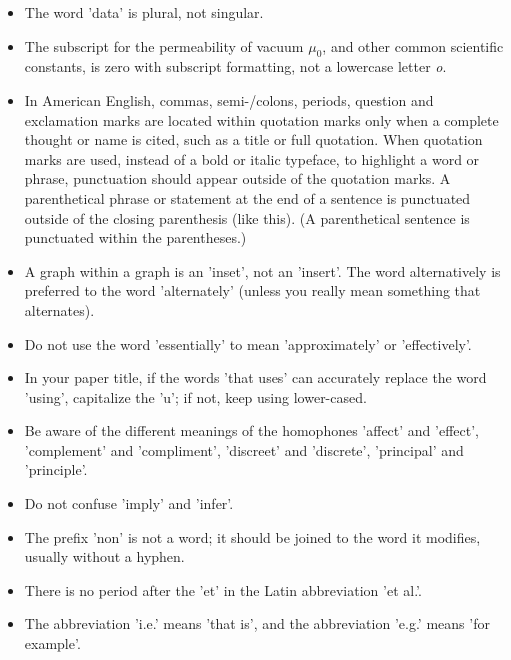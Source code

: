 \documentclass{IEEEtran4PSCC}
\begin{document}
\begin{itemize}
\setlength\itemsep{1em}

\item
The word 'data' is plural, not singular.

\item
The subscript for the permeability of vacuum $\mu_0$, and other common scientific constants, is zero with subscript formatting, not a lowercase letter \emph{o}.

\item
In American English, commas, semi-/colons, periods, question and exclamation marks are located within quotation marks only when a complete thought or name is cited, such as a title or full quotation. When quotation marks are used, instead of a bold or italic typeface, to highlight a word or phrase, punctuation should appear outside of the quotation marks. A parenthetical phrase or statement at the end of a sentence is punctuated outside of the closing parenthesis (like this). (A parenthetical sentence is punctuated within the parentheses.)

\item
A graph within a graph is an 'inset', not an 'insert'. The word alternatively is preferred to the word 'alternately' (unless you really mean something that alternates).

\item
Do not use the word 'essentially' to mean 'approximately' or 'effectively'.

\item
In your paper title, if the words 'that uses' can accurately replace the word 'using', capitalize the 'u'; if not, keep using lower-cased.

\item
Be aware of the different meanings of the homophones 'affect' and 'effect', 'complement' and 'compliment', 'discreet' and 'discrete', 'principal' and 'principle'.

\item
Do not confuse 'imply' and 'infer'.

\item
The prefix 'non' is not a word; it should be joined to the word it modifies, usually without a hyphen.

\item
There is no period after the 'et' in the Latin abbreviation 'et al.'.

\item
The abbreviation 'i.e.' means 'that is', and the abbreviation 'e.g.' means 'for example'.
\cite{Crow2021PowerBook,NRELSeinnaGitHub,Grainger1994PowerBook,EIAEnergyConsumptionWebpage,Kundur1994DynamicsBook}
\end{itemize}




\end{document}
